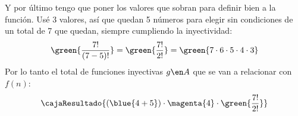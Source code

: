\begin{enumerate}[label=\alph*)]
        Y por último tengo que poner los valores que sobran para definir bien a la función. Usé 3 valores, así
        que quedan 5 números para elegir sin condiciones de un total de 7 que quedan, siempre cumpliendo la inyectividad:
        $$
          \green{\frac{7!}{(7-5)!}} = \green{\frac{7!}{2!}} = \green{7 \cdot 6 \cdot 5 \cdot 4 \cdot 3}
        $$
        Por lo tanto el total de funciones inyectivas $g \en A$ que se van a relacionar con $f(n)$:
        $$
          \cajaResultado{
            (\blue{4 + 5}) \cdot \magenta{4} \cdot \green{\frac{7!}{2!}}
          }
        $$
\end{enumerate}

\begin{aportes}
  \item {}
\end{aportes}
